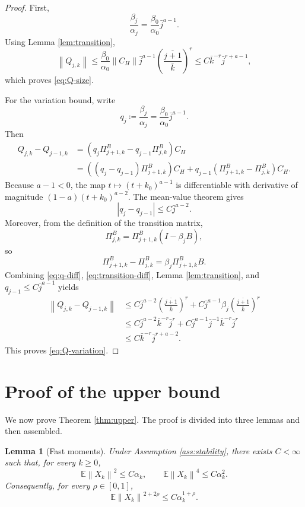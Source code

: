 \documentclass{article}
\newtheorem{lemma}[theorem]{Lemma}
\newcommand{\E}{\mathbb{E}}
\newcommand{\norm}[1]{\left\lVert #1\right\rVert}
\begin{document}
\begin{proof}
First,
\[
  \frac{\beta_j}{\alpha_j}
  =\frac{\beta_0}{\alpha_0}\bar j^{a-1}.
\]
Using Lemma \ref{lem:transition},
\[
  \norm{Q_{j,k}}
  \le \frac{\beta_0}{\alpha_0}\norm{C_H}\bar j^{a-1}
      \left(\frac{\overline{j+1}}{\bar k}\right)^r
  \le C\bar k^{-r}\bar j^{r+a-1},
\]
which proves \eqref{eq:Q-size}.

For the variation bound, write
\[
  q_j\coloneqq \frac{\beta_j}{\alpha_j}=\frac{\beta_0}{\alpha_0}\bar j^{a-1}.
\]
Then
\begin{align*}
  Q_{j,k}-Q_{j-1,k}
  &=\left(q_j\Pi^B_{j+1,k}-q_{j-1}\Pi^B_{j,k}\right)C_H\\
  &=\left((q_j-q_{j-1})\Pi^B_{j+1,k}\right)C_H
    +q_{j-1}\left(\Pi^B_{j+1,k}-\Pi^B_{j,k}\right)C_H.
\end{align*}
Because $a-1<0$, the map $t\mapsto(t+k_0)^{a-1}$ is differentiable with derivative of magnitude $(1-a)(t+k_0)^{a-2}$. The mean-value theorem gives
\begin{equation}
  |q_j-q_{j-1}|\le C\bar j^{a-2}. \label{eq:q-diff}
\end{equation}
Moreover, from the definition of the transition matrix,
\[
  \Pi^B_{j,k}=\Pi^B_{j+1,k}(I-\beta_jB),
\]
so
\begin{equation}
  \Pi^B_{j+1,k}-\Pi^B_{j,k}=\beta_j\Pi^B_{j+1,k}B. \label{eq:transition-diff}
\end{equation}
Combining \eqref{eq:q-diff}, \eqref{eq:transition-diff}, Lemma \ref{lem:transition}, and $q_{j-1}\le C\bar j^{a-1}$ yields
\[
\begin{aligned}
  \norm{Q_{j,k}-Q_{j-1,k}}
  &\le C\bar j^{a-2}\left(\frac{\overline{j+1}}{\bar k}\right)^r
     +C\bar j^{a-1}\beta_j\left(\frac{\overline{j+1}}{\bar k}\right)^r\\
  &\le C\bar j^{a-2}\bar k^{-r}\bar j^r
     +C\bar j^{a-1}\bar j^{-1}\bar k^{-r}\bar j^r\\
  &\le C\bar k^{-r}\bar j^{r+a-2}.
\end{aligned}
\]
This proves \eqref{eq:Q-variation}.
\end{proof}

\section{Proof of the upper bound}\label{app:upper}

We now prove Theorem \ref{thm:upper}. The proof is divided into three lemmas and then assembled.

\begin{lemma}[Fast moments]\label{lem:fast-moments}
Under Assumption \ref{ass:stability}, there exists $C<\infty$ such that, for every $k\ge0$,
\begin{equation}
  \E\norm{X_k}^2\le C\alpha_k,\qquad
  \E\norm{X_k}^4\le C\alpha_k^2. \label{eq:fast-second-fourth}
\end{equation}
Consequently, for every $\rho\in[0,1]$,
\begin{equation}
  \E\norm{X_k}^{2+2\rho}\le C\alpha_k^{1+\rho}. \label{eq:fast-interp}
\end{equation}
\end{lemma}
\end{document}
